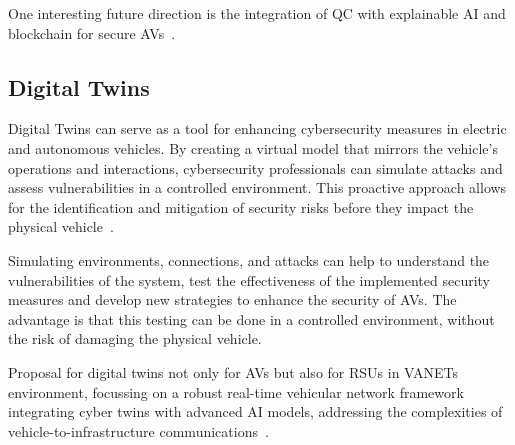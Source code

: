 One interesting future direction is the integration of QC with explainable
AI and blockchain for secure AVs~\cite{bendiab2023autonomous}.


\subsection{Digital Twins}\label{subsec:digital-twins}
Digital Twins can serve as a tool for enhancing cybersecurity measures in electric and autonomous vehicles.
By creating a virtual model that mirrors the vehicle's operations and interactions,
cybersecurity professionals can simulate attacks and assess vulnerabilities in a controlled environment.
This proactive approach allows for the identification and mitigation of security risks
before they impact the physical vehicle~\cite{ali2023review}.

Simulating environments, connections,
and attacks can help to understand the vulnerabilities of the system, test the effectiveness of the implemented security measures and develop new strategies to enhance the security of AVs.
The advantage is that this testing can be done in a controlled environment, without the risk of damaging the physical vehicle.~\cite{yigit2024cyber}

Proposal for digital twins not only for AVs but also for RSUs in VANETs environment,
focussing on a robust real-time vehicular network framework integrating cyber twins with advanced AI models,
addressing the complexities of vehicle-to-infrastructure communications~\cite{yigit2024cyber}.